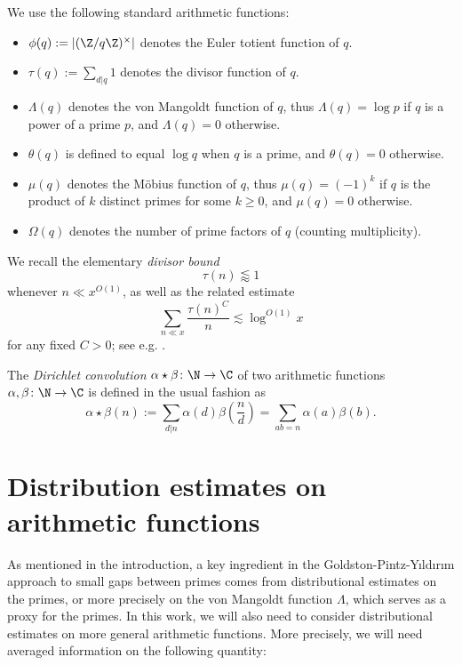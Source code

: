 We use the following standard arithmetic functions:
\begin{itemize}
\item[(i)] $\phi(q) := |(\Z/q\Z)^\times|$ denotes the Euler totient function of $q$.
\item[(ii)] $\tau(q) := \sum_{d|q} 1$ denotes the divisor function of $q$.
\item[(iii)] $\Lambda(q)$ denotes the von Mangoldt function of $q$, thus $\Lambda(q)=\log p$ if $q$ is a power of a prime $p$, and $\Lambda(q)=0$ otherwise.
\item[(iv)] $\theta(q)$ is defined to equal $\log q$ when $q$ is a prime, and $\theta(q)=0$ otherwise.
\item[(v)] $\mu(q)$ denotes the M\"obius function of $q$, thus $\mu(q) = (-1)^k$ if $q$ is the product of $k$ distinct primes for some $k \geq 0$, and $\mu(q)=0$ otherwise.
\item[(vi)] $\Omega(q)$ denotes the number of prime factors of $q$ (counting multiplicity).
\end{itemize}

We recall the elementary \emph{divisor bound}
\begin{equation}\label{divisor-bound}
\tau(n) \lessapprox 1
\end{equation}
whenever $n \ll x^{O(1)}$, as well as the related estimate
\begin{equation}\label{divisor-2}
\sum_{n \ll x} \frac{\tau(n)^C}{n} \lesssim \log^{O(1)} x
\end{equation}
for any fixed $C>0$; see e.g. \cite[Lemma 1.5]{polymath8a}.

The \emph{Dirichlet convolution} $\alpha \star \beta \colon \N \to \C$
of two arithmetic functions $\alpha,\beta \colon \N \to \C$ is defined
in the usual fashion as
$$ \alpha\star\beta(n) := \sum_{d|n} \alpha(d)
\beta\left(\frac{n}{d}\right) =\sum_{ab=n}{\alpha(a)\beta(b)}.$$

\section{Distribution estimates on arithmetic functions}

As mentioned in the introduction, a key ingredient in the Goldston-Pintz-Y{\i}ld{\i}r{\i}m approach to small gaps between primes comes from distributional estimates on the primes, or more precisely on the von Mangoldt function $\Lambda$, which serves as a proxy for the primes.  In this work, we will also need to consider distributional estimates on more general arithmetic functions.  More precisely, we will need averaged information on the following quantity:

